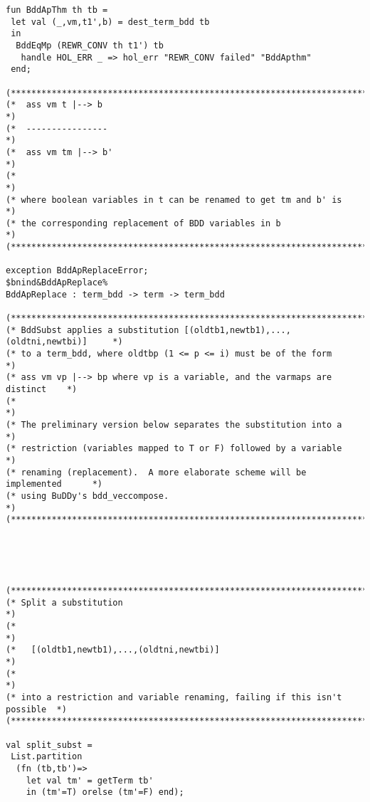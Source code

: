 \documentclass[12pt]{article}
\begin{document}
\begin{footnotesize}
\begin{Verbatim}[commandchars=\$\&\%]
fun BddApThm th tb =
 let val (_,vm,t1',b) = dest_term_bdd tb
 in
  BddEqMp (REWR_CONV th t1') tb 
   handle HOL_ERR _ => hol_err "REWR_CONV failed" "BddApthm"
 end;

(*****************************************************************************)
(*  ass vm t |--> b                                                          *)
(*  ----------------                                                         *)
(*  ass vm tm |--> b'                                                        *)
(*                                                                           *)
(* where boolean variables in t can be renamed to get tm and b' is           *)
(* the corresponding replacement of BDD variables in b                       *)
(*****************************************************************************)

exception BddApReplaceError;
$bnind&BddApReplace%
BddApReplace : term_bdd -> term -> term_bdd

(*****************************************************************************)
(* BddSubst applies a substitution [(oldtb1,newtb1),...,(oldtni,newtbi)]     *)
(* to a term_bdd, where oldtbp (1 <= p <= i) must be of the form             *)
(* ass vm vp |--> bp where vp is a variable, and the varmaps are distinct    *)
(*                                                                           *)
(* The preliminary version below separates the substitution into a           *)
(* restriction (variables mapped to T or F) followed by a variable           *)
(* renaming (replacement).  A more elaborate scheme will be implemented      *)
(* using BuDDy's bdd_veccompose.                                             *)
(*****************************************************************************)





(*****************************************************************************)
(* Split a substitution                                                      *)
(*                                                                           *)
(*   [(oldtb1,newtb1),...,(oldtni,newtbi)]                                   *)
(*                                                                           *)
(* into a restriction and variable renaming, failing if this isn't possible  *)
(*****************************************************************************) 

val split_subst =
 List.partition 
  (fn (tb,tb')=>
    let val tm' = getTerm tb'
    in (tm'=T) orelse (tm'=F) end);


\end{Verbatim}
\end{footnotesize}
\end{document}
